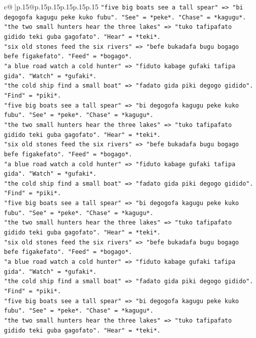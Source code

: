 \documentclass{article}
\begin{document}
{\begin{supertabular}{c@{$\;$}|p{.15\linewidth}@{}p{.15\linewidth}p{.15\linewidth}p{.15\linewidth}p{.15\linewidth}p{.15\linewidth}}
{{{\texttt{"five big boats see a tall spear" => "bi degogofa kagugu peke kuko fubu". "See" = *peke*. "Chase" = *kagugu*.} \\
\texttt{"the two small hunters hear the three lakes" => "tuko tafipafato gidido teki guba gagofato". "Hear" = *teki*.} \\
\texttt{"six old stones feed the six rivers" => "befe bukadafa bugu bogago befe figakefato". "Feed" = *bogago*.} \\
\texttt{"a blue road watch a cold hunter" => "fiduto kabage gufaki tafipa gida". "Watch" = *gufaki*.} \\
\texttt{"the cold ship find a small boat" => "fadato gida piki degogo gidido". "Find" = *piki*.} \\
\texttt{"five big boats see a tall spear" => "bi degogofa kagugu peke kuko fubu". "See" = *peke*. "Chase" = *kagugu*.} \\
\texttt{"the two small hunters hear the three lakes" => "tuko tafipafato gidido teki guba gagofato". "Hear" = *teki*.} \\
\texttt{"six old stones feed the six rivers" => "befe bukadafa bugu bogago befe figakefato". "Feed" = *bogago*.} \\
\texttt{"a blue road watch a cold hunter" => "fiduto kabage gufaki tafipa gida". "Watch" = *gufaki*.} \\
\texttt{"the cold ship find a small boat" => "fadato gida piki degogo gidido". "Find" = *piki*.} \\
\texttt{"five big boats see a tall spear" => "bi degogofa kagugu peke kuko fubu". "See" = *peke*. "Chase" = *kagugu*.} \\
\texttt{"the two small hunters hear the three lakes" => "tuko tafipafato gidido teki guba gagofato". "Hear" = *teki*.} \\
\texttt{"six old stones feed the six rivers" => "befe bukadafa bugu bogago befe figakefato". "Feed" = *bogago*.} \\
\texttt{"a blue road watch a cold hunter" => "fiduto kabage gufaki tafipa gida". "Watch" = *gufaki*.} \\
\texttt{"the cold ship find a small boat" => "fadato gida piki degogo gidido". "Find" = *piki*.} \\
\texttt{"five big boats see a tall spear" => "bi degogofa kagugu peke kuko fubu". "See" = *peke*. "Chase" = *kagugu*.} \\
\texttt{"the two small hunters hear the three lakes" => "tuko tafipafato gidido teki guba gagofato". "Hear" = *teki*.} \\
}}}
\end{supertabular}}
\end{document}
